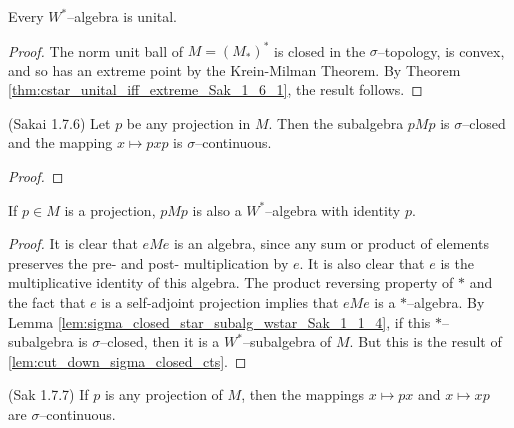 \begin{lemma}
  \label{lem:wstar_unital}
  \leanok
  Every $W^{*}$--algebra is unital.
\end{lemma}

\begin{proof}
  \leanok
  The norm unit ball of $M=(M_{*})^{*}$ is closed in the $\sigma$--topology, is convex, and so has an extreme point by the Krein-Milman Theorem.
  By Theorem \ref{thm:cstar_unital_iff_extreme_Sak_1_6_1}, the result follows.
\end{proof}

\begin{lemma}
  \label{lem:cut_down_sigma_closed_cts_Sak_1_7_6} (Sakai 1.7.6)
  Let $p$ be any projection in $M$. Then the subalgebra $pMp$ is $\sigma$--closed and the mapping $x\mapsto pxp$ is $\sigma$--continuous.
\end{lemma}

\begin{proof}
\end{proof}

\begin{lemma}
  \label{lem:cut_down_of_wstar}
  If $p\in M$ is a projection, $pMp$ is also a $W^{*}$--algebra with identity $p$.
\end{lemma}

\begin{proof}
  It is clear that $eMe$ is an algebra, since any sum or product of elements preserves the pre- and post- multiplication by $e$.
  It is also clear that $e$ is the multiplicative identity of this algebra. The product reversing property of $*$ and the fact that
  $e$ is a self-adjoint projection implies that $eMe$ is a $*$--algebra. By Lemma \ref{lem:sigma_closed_star_subalg_wstar_Sak_1_1_4}, if this
  $*$--subalgebra is $\sigma$--closed, then it is a $W^{*}$--subalgebra of $M$. But this is the result of \ref{lem:cut_down_sigma_closed_cts}.
\end{proof}

\begin{lemma}
  \label{lem:left_mul_proj_right_mul_proj_sig_cts_Sak_1_7_7} (Sak 1.7.7)
  If $p$ is any projection of $M$, then the mappings $x\mapsto px$ and
  $x\mapsto xp$ are $\sigma$--continuous.
\end{lemma}

